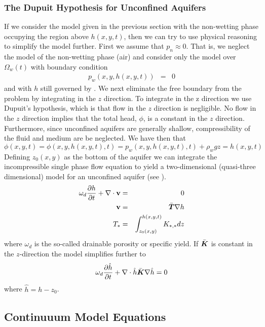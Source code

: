 \documentclass[10pt,dvips,twoside,reqno]{amsart}
\begin{document}
\subsubsection{The Dupuit Hypothesis for Unconfined Aquifers}
If we consider the model given in the previous section with the
non-wetting phase occupying the region above $h(x,y,t)$, then we can
try to use physical reasoning to simplify the model further. First we assume
that $p_n \approx 0$. That is, we neglect the model of the non-wetting
phase (air) and consider only the model over $\Omega_w(t)$ with boundary
condition
\begin{eqnarray}
  \label{eq:unconfinedBC}
  p_w(x,y,h(x,y,t)) &=& 0
\end{eqnarray}
and with $h$ still governed by . We next eliminate the free
boundary from the problem by integrating in the $z$ direction. To
integrate in the z direction we use Dupuit's hypothesis, which is that
flow in the $z$ direction is negligible. No flow in the $z$ direction
implies that the total head, $\phi$, is a constant in the $z$
direction. Furthermore, since unconfined aquifers are generally
shallow, compressibility of the fluid and medium are be neglected.  We
have then that 
\begin{equation}
\phi(x,y,t) = \phi(x,y,h(x,y,t),t) = p_w(x,y,h(x,y,t),t) + \rho_w g z
= h(x,y,t)
\end{equation}
Defining $z_0(x,y)$ as the bottom of the aquifer we can integrate the
incompressible single phase flow equation to yield a two-dimensional
(quasi-three dimensional) model for an unconfined aquifer (see
\citep{DeMarsily_86}).
\begin{eqnarray}
  \label{eq:2dFlow}
\omega_d \frac{\partial {h}}{\partial {t}} + \nabla \cdot {\bf v} &=& 0 \\
{\bf v} &=& \bar{\mbox{{\boldmath ${T}$}}} \nabla h \\
T_* &=& \int_{z_0(x,y)}^{h(x,y,t)} K_{*,*} dz 
\end{eqnarray}
where $\omega_d$ is the so-called drainable porosity or specific
yield. If $\bar{\mbox{{\boldmath ${K}$}}}$ is constant in the $z$-direction the model
simplifies further to
\begin{equation}
  \label{eq:2dFlowHomZ}
  \omega_d \frac{\partial {\hat{h}}}{\partial {t}} + \nabla \cdot \hat{h} \bar{\mbox{{\boldmath ${K}$}}} \nabla \hat{h} = 0
\end{equation}
where $\hat{h} = h - z_0$.

\subsection{Continuuum Model Equations}
\end{document}
